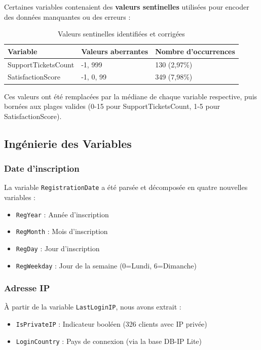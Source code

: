 \documentclass[11pt,a4paper]{article}
\begin{document}
Certaines variables contenaient des \textbf{valeurs sentinelles} utilisées pour encoder des données manquantes ou des erreurs :

\begin{table}[H]
\centering
\begin{tabular}{lll}
\toprule
\textbf{Variable} & \textbf{Valeurs aberrantes} & \textbf{Nombre d'occurrences} \\
\midrule
SupportTicketsCount & -1, 999 & 130 (2,97\%) \\
SatisfactionScore & -1, 0, 99 & 349 (7,98\%) \\
\bottomrule
\end{tabular}
\caption{Valeurs sentinelles identifiées et corrigées}
\end{table}

Ces valeurs ont été remplacées par la médiane de chaque variable respective, puis bornées aux plages valides (0-15 pour SupportTicketsCount, 1-5 pour SatisfactionScore).

\subsection{Ingénierie des Variables}

\subsubsection{Date d'inscription}
La variable \texttt{RegistrationDate} a été parsée et décomposée en quatre nouvelles variables :
\begin{itemize}
    \item \texttt{RegYear} : Année d'inscription
    \item \texttt{RegMonth} : Mois d'inscription
    \item \texttt{RegDay} : Jour d'inscription
    \item \texttt{RegWeekday} : Jour de la semaine (0=Lundi, 6=Dimanche)
\end{itemize}

\subsubsection{Adresse IP}
À partir de la variable \texttt{LastLoginIP}, nous avons extrait :
\begin{itemize}
    \item \texttt{IsPrivateIP} : Indicateur booléen (326 clients avec IP privée)
    \item \texttt{LoginCountry} : Pays de connexion (via la base DB-IP Lite)
\end{itemize}
\end{document}
